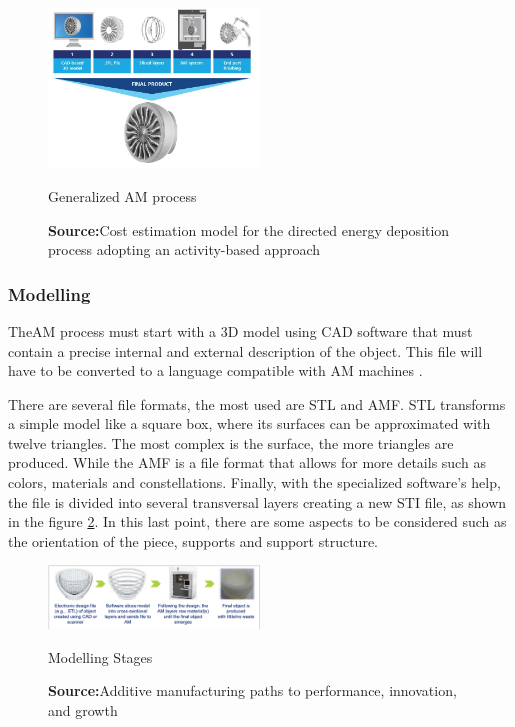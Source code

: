 \begin{figure}[h]
\centering
\includegraphics[width=0.5\textwidth]{./Images/AM_STEPS.png}
\caption{Generalized AM process}
\label{Aviao}
\caption*{\textbf{Source:}Cost estimation model for the directed energy deposition process adopting an activity-based approach \cite{santos2018cost}}
\end{figure}


\subsubsection{Modelling}
The\ac{AM} process must start with a 3D model using CAD software that must contain a precise internal and external description of the object.
This file will have to be converted to a language compatible with AM machines \cite{gibson2014additive}.\par
There are several file formats, the most used are \ac{STL} and \ac{AMF}.
STL transforms a simple model like a square box, where its surfaces can be approximated with twelve triangles. The most complex is the surface, the more triangles are produced. While the \ac{AMF} is a file format that allows for more details such as colors, materials and constellations\cite{gibson2014additive}.
Finally, with the specialized software's help, the file is divided into several transversal layers creating a new STI file, as shown in the figure \ref{STL}\cite{gibson2014additive}.
In this last point, there are some aspects to be considered such as the orientation of the piece, supports and support structure.

\begin{figure}[h]
\centering
\includegraphics[width=0.5\textwidth]{./Images/STL.png}
\caption{Modelling Stages}
\label{STL}
\caption*{\textbf{Source:}Additive manufacturing paths to performance, innovation, and growth \cite{cotteleer20143d}}
\end{figure}



